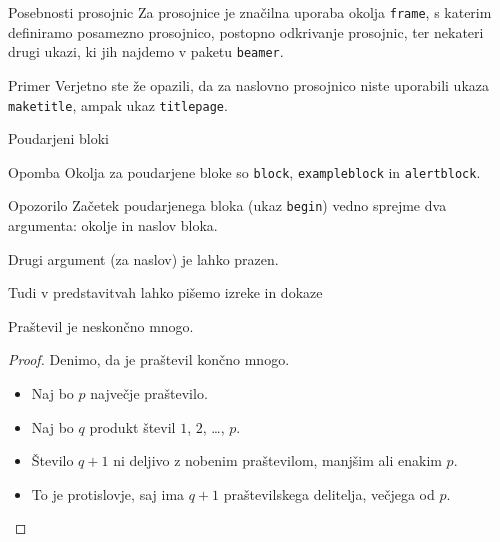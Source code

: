 \begin{frame}{Posebnosti prosojnic}
    Za prosojnice je značilna uporaba okolja \texttt{frame}, s katerim
    definiramo posamezno prosojnico, postopno odkrivanje prosojnic,
    \pause
    ter nekateri drugi ukazi, ki jih najdemo v paketu \texttt{beamer}.
    \pause

    \begin{exampleblock}{Primer}
        Verjetno ste že opazili, da za naslovno prosojnico niste uporabili
        ukaza \texttt{maketitle}, ampak ukaz \texttt{titlepage}.
    \end{exampleblock}
\end{frame}

\begin{frame}{Poudarjeni bloki}
    \begin{block}{Opomba}
        Okolja za poudarjene bloke so \texttt{block},
        \texttt{exampleblock} in \texttt{alertblock}.
    \end{block}

    \begin{alertblock}{Opozorilo}
        Začetek poudarjenega bloka (ukaz \texttt{begin}) vedno sprejme
        dva argumenta: okolje in naslov bloka.

        Drugi argument (za naslov) je lahko prazen.
    \end{alertblock}
\end{frame}

\begin{frame}{Tudi v predstavitvah lahko pišemo izreke in dokaze}
    \begin{izrek}
        Praštevil je neskončno mnogo.
    \end{izrek}

    \begin{proof}
        Denimo, da je praštevil končno mnogo.

        \begin{itemize}[<+->]
            \item Naj bo \(p\) \alert<4>{največje} praštevilo.
            \item Naj bo \(q\) produkt števil \(1\), \(2\), \ldots, \(p\).
            \item Število \(q+1\) ni deljivo z nobenim praštevilom,
                  manjšim ali enakim \(p\).
            \item To je protislovje, saj ima \(q+1\)
                  praštevilskega delitelja, večjega od \(p\). \qedhere
        \end{itemize}
    \end{proof}
\end{frame}